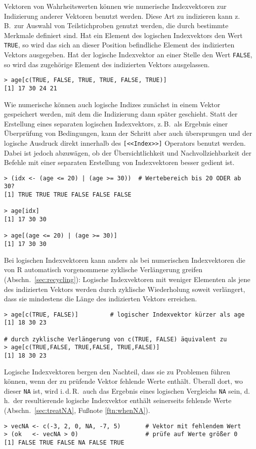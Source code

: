 Vektoren von Wahrheitswerten können wie numerische Indexvektoren zur Indizierung anderer Vektoren benutzt werden. Diese Art zu indizieren kann z.\,B.\ zur Auswahl von Teilstichproben genutzt werden, die durch bestimmte Merkmale definiert sind. Hat ein Element des logischen Indexvektors den Wert \lstinline!TRUE!, so wird das sich an dieser Position befindliche Element des indizierten Vektors ausgegeben. Hat der logische Indexvektor an einer Stelle den Wert \lstinline!FALSE!, so wird das zugehörige Element des indizierten Vektors ausgelassen.
\begin{lstlisting}
> age[c(TRUE, FALSE, TRUE, TRUE, FALSE, TRUE)]
[1] 17 30 24 21
\end{lstlisting}

Wie numerische können auch logische Indizes zunächst in einem Vektor gespeichert werden, mit dem die Indizierung dann später geschieht. Statt der Erstellung eines separaten logischen Indexvektors, z.\,B.\ als Ergebnis einer Überprüfung von Bedingungen, kann der Schritt aber auch übersprungen und der logische Ausdruck direkt innerhalb des \lstinline![<<Index>>]! Operators benutzt werden. Dabei ist jedoch abzuwägen, ob der Übersichtlichkeit und Nachvollziehbarkeit der Befehle mit einer separaten Erstellung von Indexvektoren besser gedient ist.
\begin{lstlisting}
> (idx <- (age <= 20) | (age >= 30))  # Wertebereich bis 20 ODER ab 30?
[1] TRUE TRUE TRUE FALSE FALSE FALSE

> age[idx]
[1] 17 30 30

> age[(age <= 20) | (age >= 30)]
[1] 17 30 30
\end{lstlisting}

Bei logischen Indexvektoren kann anders als bei numerischen Indexvektoren die von R automatisch vorgenommene zyklische Verlängerung greifen (Abschn.\ \ref{sec:recycling}): Logische Indexvektoren mit weniger Elementen als jene des indizierten Vektors werden durch zyklische Wiederholung soweit verlängert, dass sie mindestens die Länge des indizierten Vektors erreichen.
\begin{lstlisting}
> age[c(TRUE, FALSE)]         # logischer Indexvektor kürzer als age
[1] 18 30 23

# durch zyklische Verlängerung von c(TRUE, FALSE) äquivalent zu
> age[c(TRUE,FALSE, TRUE,FALSE, TRUE,FALSE)]
[1] 18 30 23
\end{lstlisting}

Logische Indexvektoren bergen den Nachteil, dass sie zu Problemen führen können, wenn der zu prüfende Vektor fehlende Werte enthält. Überall dort, wo dieser \lstinline!NA! ist, wird i.\,d.\,R.\ auch das Ergebnis eines logischen Vergleichs \lstinline!NA! sein, d.\,h.\ der resultierende logische Indexvektor enthält seinerseits fehlende Werte (Abschn.\ \ref{sec:treatNA}, Fußnote \ref{ftn:whenNA}).
\begin{lstlisting}
> vecNA <- c(-3, 2, 0, NA, -7, 5)       # Vektor mit fehlendem Wert
> (ok   <- vecNA > 0)                   # prüfe auf Werte größer 0
[1] FALSE TRUE FALSE NA FALSE TRUE
\end{lstlisting}

